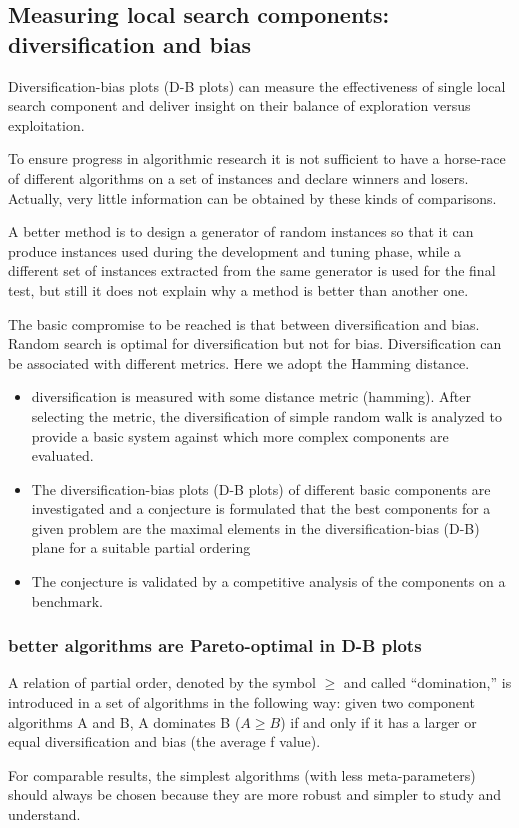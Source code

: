 \documentclass[10pt]{article}
\begin{document}
\subsection{Measuring local search components: diversification and bias}
Diversification-bias plots (D-B plots) can measure the effectiveness of single local search component and deliver insight on their balance of exploration versus exploitation. 

To ensure progress in algorithmic research it is not sufficient to have a horse-race of different algorithms on a set of instances and declare winners and losers. Actually, very little information can be obtained by these kinds of comparisons.

A better method is to design a generator of random instances so that it can produce instances used during the development and tuning phase, while a different set of instances extracted from the same generator is used for the final test, but still it does not explain why a method is better than another one.

The basic compromise to be reached is that between diversification and bias.
Random search is optimal for diversification but not for bias. Diversification can be associated with different metrics. Here we adopt the Hamming distance.

\begin{itemize}
\item diversification is measured with some distance metric (hamming). After selecting the metric, the diversification of simple random walk is analyzed to provide a basic system against which more complex components are evaluated. 
\item The diversification-bias plots (D-B plots) of different basic components are investigated and a conjecture is formulated that the best components for a given problem are the maximal elements in the diversification-bias (D-B) plane for a suitable partial ordering
\item The conjecture is validated by a competitive analysis of the components on a benchmark.
\end{itemize}

\subsubsection{better algorithms are Pareto-optimal in D-B plots}
A relation of partial order, denoted by the symbol $ \geq $ and called “domination,” is introduced in a set of algorithms in the following way: given two component algorithms A and B, A dominates B ($ A \geq B $) if and only if it has a larger or equal diversification and bias (the average f value).

For comparable results, the simplest algorithms (with less meta-parameters) should always be chosen because they are more robust and simpler to study and understand.
\end{document}
